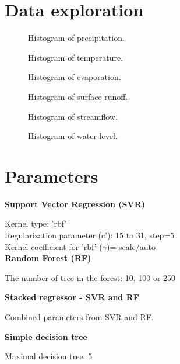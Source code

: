 \section{Data exploration}

  \begin{figure}[H]
  \centering
  
  \caption{Histogram of precipitation.}
  \end{figure}

    \begin{figure}[H]
  \centering
  
  \caption{Histogram of temperature.}
  \end{figure}

    \begin{figure}[H]
  \centering
  
  \caption{Histogram of evaporation.}
  \end{figure}

    \begin{figure}[H]
  \centering
  
  \caption{Histogram of surface runoff.}
  \end{figure}

      \begin{figure}[H]
  \centering
  
  \caption{Histogram of streamflow.}
  \end{figure}

      \begin{figure}[H]
  \centering
  
  \caption{Histogram of water level.}
  \end{figure}

\section{Parameters}
\noindent
\textbf{Support Vector Regression (SVR)}

\noindent
Kernel type: 'rbf' \\
Regularization parameter (c'): 15 to 31, step=5\\
Kernel coefficient for 'rbf' ($\gamma$)= scale/auto\\

\noindent
\textbf{Random Forest (RF)}

\noindent
The number of tree in the forest: 10, 100 or 250

\noindent
\textbf{Stacked regressor - SVR and RF}

\noindent
Combined parameters from SVR and RF.

\noindent
\textbf{Simple decision tree}

\noindent
Maximal decision tree: 5







